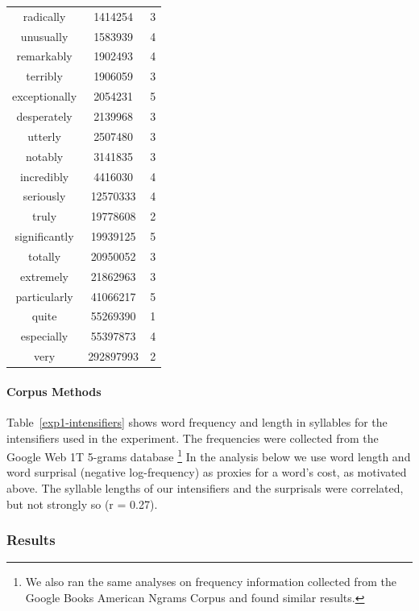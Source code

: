 \documentclass[10pt,letterpaper]{article}
\newcommand{\todo}[1]{{\color{red}#1}}
\begin{document}
\begin{table}[ht]
\begin{center}
\begin{tabular}{ccc}
    radically & 1414254 & 3 \\
    unusually & 1583939 & 4 \\
    remarkably & 1902493 & 4 \\
    terribly & 1906059 & 3 \\
    exceptionally & 2054231 & 5 \\
    desperately & 2139968 & 3 \\
    utterly & 2507480 & 3 \\
    notably & 3141835 & 3 \\
    incredibly & 4416030 & 4 \\
    seriously & 12570333 & 4 \\
    truly & 19778608 & 2 \\
    significantly & 19939125 & 5 \\
    totally & 20950052 & 3 \\
    extremely & 21862963 & 3 \\
    particularly & 41066217 & 5 \\
    quite & 55269390 & 1 \\
    especially & 55397873 & 4 \\
    very & 292897993 & 2
  \end{tabular}
 \end{center}
\end{table}

\paragraph{Corpus Methods}

Table~\ref{exp1-intensifiers} shows word frequency and length in syllables for the intensifiers used in the experiment.
The frequencies were collected from the Google Web 1T 5-grams database \cite{web1t5gram}\footnote{
We also ran the same analyses on frequency information collected from the Google Books American Ngrams Corpus \cite{books2011} and found similar results.
}
In the analysis below we use word length and word surprisal (negative log-frequency) as proxies for a word's cost, as motivated above.
The syllable lengths of our intensifiers and the surprisals %
were correlated, but not strongly so (r = 0.27).

\subsubsection{Results}
\end{document}
